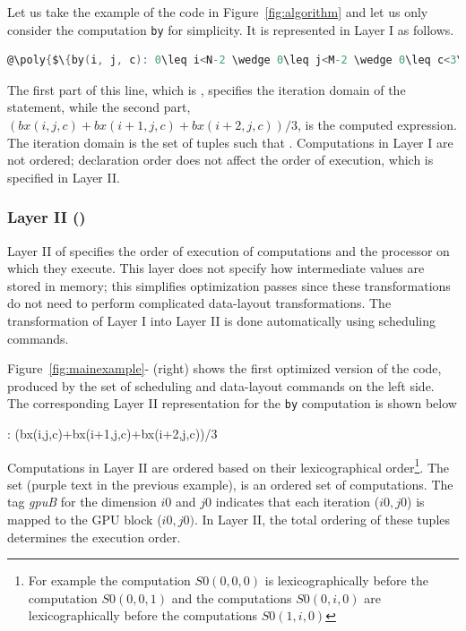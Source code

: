Let us take the example of the code in Figure~\ref{fig:algorithm} and let us only consider the computation \texttt{by} for simplicity. It is represented in Layer I as follows.

\begin{lstlisting}[language=C,escapechar=@]
@\poly{$\{by(i, j, c): 0\leq i<N-2 \wedge 0\leq j<M-2 \wedge 0\leq c<3\}$}@:(bx(i,j,c)+bx(i+1,j,c)+bx(i+2,j,c))/3
\end{lstlisting}

The first part of this line, which is
, specifies the iteration domain of the statement, while the second part, $(bx(i,j,c)+bx(i+1,j,c)+bx(i+2,j,c))/3$, is the computed expression.
The iteration domain is the set of tuples  such that .
Computations in Layer I are not ordered;  declaration order does not affect the order of execution, which is specified in Layer II. 

\subsubsection{Layer II (\Layertwo)}
\label{layer2}

Layer II of \framework{} specifies the order of execution of computations and the processor on which they execute.  This layer does not specify how intermediate values are stored in memory; this simplifies optimization passes since these transformations do not need to perform complicated data-layout transformations.  The transformation of Layer I into Layer II is done automatically using scheduling commands.

Figure~\ref{fig:mainexample}-\codetwo{} (right) shows the first optimized version of the code, produced by the set of scheduling and data-layout commands on the left side.
The corresponding Layer II representation for the \texttt{by} computation is shown below

\noindent
{} : (bx(i,j,c)+bx(i+1,j,c)+bx(i+2,j,c))/3

Computations in Layer II are ordered based on their lexicographical order\footnote{For example the computation $S0(0, 0, 0)$ is lexicographically before the computation \mbox{$S0(0, 0, 1)$} and the computations $S0(0, i, 0)$ are lexicographically before the computations $S0(1, i, 0)$}.  The set (purple text in the previous example), is an ordered set of computations.
The tag \emph{gpuB} for the dimension $i0$ and $j0$ indicates that each iteration ($i0,j0$) is mapped to the GPU block ($i0,j0)$. In Layer II, the total ordering of these tuples determines the execution order.

